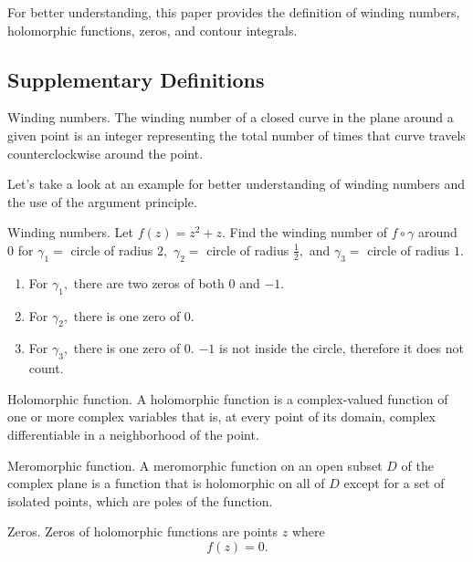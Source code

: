 \documentclass[11pt,reqno,oneside,a4paper]{article}
\begin{document}
For better understanding, this paper provides the definition of winding numbers, holomorphic functions, zeros, and contour integrals.


\subsection{Supplementary Definitions}
\begin{defn}{Winding numbers.}
The winding number of a closed curve in the plane around a given point is an integer representing the total number of times that curve travels counterclockwise around the point. 
\end{defn}

Let's take a look at an example for better understanding of winding numbers and the use of the argument principle.
\begin{prob}{Winding numbers.}
Let $f(z) = z^2+z$. Find the winding number of $f \circ \gamma$ around $0$ for 
$\gamma_1 =$ circle of radius $2,$ 
$\gamma_2 =$ circle of radius $\frac{1}{2},$ and
$\gamma_3 =$ circle of radius $1$. 

\begin{enumerate}
$f(z) = z(z+1)$ has zeros at $0$ and $-1$.
\item For $\gamma_1,$ there are two zeros of both $0$ and $-1.$
\item For $\gamma_2,$ there is one zero of $0$.
\item For $\gamma_3,$ there is one zero of $0.$ $-1$ is not inside the circle, therefore it does not count.
\end{enumerate}
\end{prob}

\begin{defn}{Holomorphic function.}
A holomorphic function is a complex-valued function of one or more complex variables that is, at every point of its domain, complex differentiable in a neighborhood of the point. 
\end{defn}

\begin{defn}{Meromorphic function.}
A meromorphic function on an open subset $D$ of the complex plane is a function that is holomorphic on all of $D$ except for a set of isolated points, which are poles of the function. 
\end{defn}

\begin{defn}{Zeros.}
Zeros of holomorphic functions are points $z$ where $$f(z) = 0.$$
\end{defn}
\end{document}
